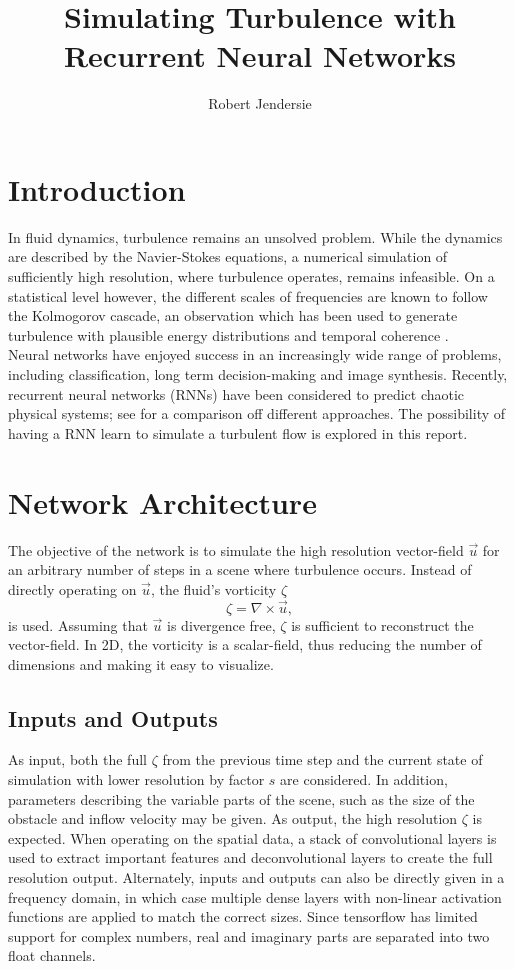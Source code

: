 \documentclass[sigconf]{acmart}
\newcommand{\curl}[1]{{\nabla} \times #1} %
\begin{document}
\title{Simulating Turbulence with Recurrent Neural Networks }
\subtitle{}

\author{Robert Jendersie}

\maketitle

\section{Introduction}
In fluid dynamics, turbulence remains an unsolved problem. While the dynamics are described by the Navier-Stokes equations, a numerical simulation of sufficiently high resolution, where turbulence operates, remains infeasible. On a statistical level however, the different scales of frequencies are known to follow the Kolmogorov cascade, an observation which has been used to generate turbulence with plausible energy distributions and temporal coherence \cite{kim2008wavelet}. \\
Neural networks have enjoyed success in an increasingly wide range of problems, including classification, long term decision-making and image synthesis.
Recently, recurrent neural networks (RNNs) have been considered to predict chaotic physical systems; see \cite{vlachas2019forecasting} for a comparison off different approaches.
The possibility of having a RNN learn to simulate a turbulent flow is explored in this report.
\section{Network Architecture}
The objective of the network is to simulate the high resolution vector-field $\vec{u}$ for an arbitrary number of steps in a scene where turbulence occurs.
Instead of directly operating on $\vec{u}$, the fluid's vorticity $\zeta$
\[
\zeta = \curl{\vec{u}},
\]
is used. Assuming that $\vec{u}$ is divergence free, $\zeta$ is sufficient to reconstruct the vector-field. In 2D, the vorticity is a scalar-field, thus reducing the number of dimensions and making it easy to visualize.
\subsection{Inputs and Outputs}
As input, both the full $\zeta$ from the previous time step and the current state of simulation with lower resolution by factor $s$ are considered. 
In addition, parameters describing the variable parts of the scene, such as the size of the obstacle and inflow velocity may be given.
As output, the high resolution $\zeta$ is expected.
When operating on the spatial data, a stack of convolutional layers is used to extract important features and deconvolutional layers to create the full resolution output. Alternately, inputs and outputs can also be directly given in a frequency domain, in which case multiple dense layers with non-linear activation functions are applied to match the correct sizes. Since tensorflow has limited support for complex numbers, real and imaginary parts are separated into two float channels.
\end{document}
